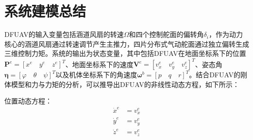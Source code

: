 \section{系统建模总结}

DFUAV的输入变量包括涵道风扇的转速$\Omega$和四个控制舵面的偏转角$\delta_i$，作为动力核心的涵道风扇通过转速调节产生主推力，四片分布式气动舵面通过独立偏转生成三维控制力矩。系统的输出为状态变量，其中包括DFUAV在地面坐标系下的位置$\boldsymbol{P}^{e}=[{x}^{e} \quad {y}^{e} \quad {z}^{e}]^{T}$、地面坐标系下的速度$\boldsymbol{V}^{e}=[{v}^{e}_{x} \quad {v}^{e}_{y} \quad {v}^{e}_{z}]^{T}$、姿态角$\boldsymbol{\eta}=[\varphi \quad \theta \quad \psi]^T$以及机体坐标系下的角速度$\boldsymbol{\omega}^b=[p \quad q \quad r]^T$。结合DFUAV的刚体模型和力与力矩的分析，可以推导出DFUAV的非线性动态方程，如下所示：

位置动态方程：
\begin{equation}
    \begin{aligned}
        \dot{x}^{e}&=v_x^e\\
        \dot{y}^{e}&=v_y^e\\
        \dot{z}^{e}&=v_z^e
    \end{aligned}
    \label{eq_40}
\end{equation}

